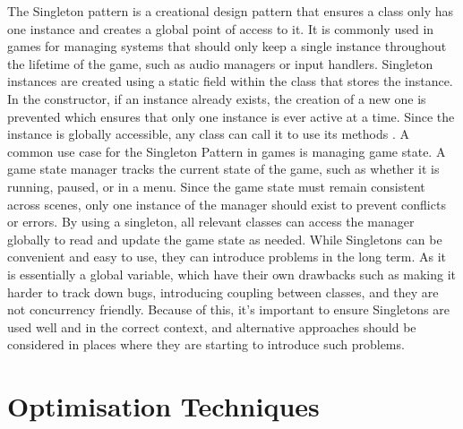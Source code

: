 \documentclass[10pt]{final_report}
\begin{document}
The Singleton pattern is a creational design pattern that ensures a class only has one instance and creates a global point of access to it. It is commonly used in games for managing systems that should only keep a single instance throughout the lifetime of the game, such as audio managers or input handlers.
Singleton instances are created using a static field within the class that stores the instance. In the constructor, if an instance already exists, the creation of a new one is prevented which ensures that only one instance is ever active at a time. Since the instance is globally accessible, any class can call it to use its methods \cite{Doran2017}. A common use case for the Singleton Pattern in games is managing game state. A game state manager tracks the current state of the game, such as whether it is running, paused, or in a menu. Since the game state must remain consistent across scenes, only one instance of the manager should exist to prevent conflicts or errors. By using a singleton, all relevant classes can access the manager globally to read and update the game state as needed. \newline
While Singletons can be convenient and easy to use, they can introduce problems in the long term. As it is essentially a global variable, which have their own drawbacks such as making it harder to track down bugs, introducing coupling between classes, and they are not concurrency friendly. Because of this, it's important to ensure Singletons are used well and in the correct context, and alternative approaches should be considered in places where they are starting to introduce such problems.

\section{Optimisation Techniques}\label{optimisation}
\end{document}

